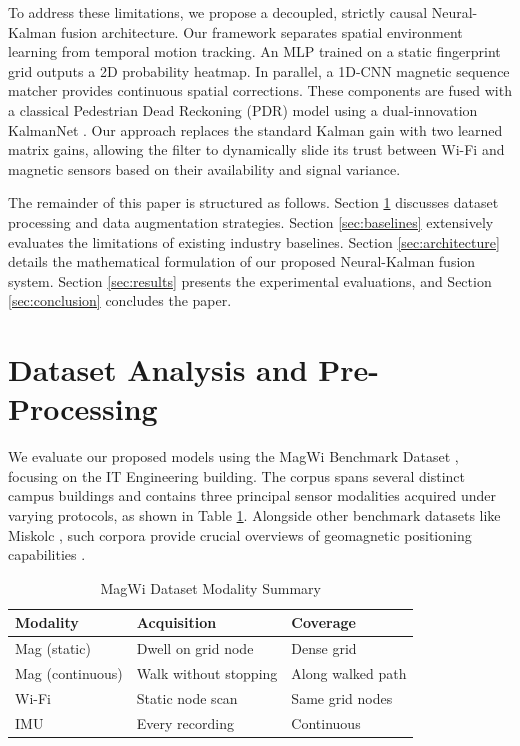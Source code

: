 \documentclass[conference]{IEEEtran}
\begin{document}
To address these limitations, we propose a decoupled, strictly causal Neural-Kalman fusion architecture. Our framework separates spatial environment learning from temporal motion tracking. An MLP trained on a static fingerprint grid outputs a 2D probability heatmap. In parallel, a 1D-CNN magnetic sequence matcher provides continuous spatial corrections. These components are fused with a classical Pedestrian Dead Reckoning (PDR) model using a dual-innovation KalmanNet \cite{kalmannet}. Our approach replaces the standard Kalman gain with two learned matrix gains, allowing the filter to dynamically slide its trust between Wi-Fi and magnetic sensors based on their availability and signal variance.

The remainder of this paper is structured as follows. Section \ref{sec:data} discusses dataset processing and data augmentation strategies. Section \ref{sec:baselines} extensively evaluates the limitations of existing industry baselines. Section \ref{sec:architecture} details the mathematical formulation of our proposed Neural-Kalman fusion system. Section \ref{sec:results} presents the experimental evaluations, and Section \ref{sec:conclusion} concludes the paper.

\section{Dataset Analysis and Pre-Processing}\label{sec:data}

We evaluate our proposed models using the MagWi Benchmark Dataset \cite{magwi}, focusing on the IT Engineering building. The corpus spans several distinct campus buildings and contains three principal sensor modalities acquired under varying protocols, as shown in Table \ref{tab:dataset_summary}. Alongside other benchmark datasets like Miskolc \cite{miskolc}, such corpora provide crucial overviews of geomagnetic positioning capabilities \cite{overviewdatasets}.

\begin{table}[htbp]
\caption{MagWi Dataset Modality Summary}
\label{tab:dataset_summary}
\centering
\begin{tabular}{@{}lll@{}}
\toprule
\textbf{Modality} & \textbf{Acquisition} & \textbf{Coverage} \\ \midrule
Mag (static) & Dwell on grid node & Dense grid  \\
Mag (continuous) & Walk without stopping & Along walked path  \\
Wi-Fi & Static node scan & Same grid nodes  \\
IMU & Every recording & Continuous  \\ \bottomrule
\end{tabular}
\end{table}
\end{document}

